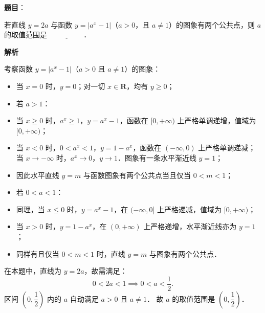 \begin{answer}

\textbf{题目}：

若直线 $y = 2a$ 与函数 $y = |a^x - 1|$（$a > 0$，且 $a \neq 1$）的图象有两个公共点，则 $a$ 的取值范围是 $\underline{\hspace{2cm}}$．

\textbf{解析}

考察函数 $y = |a^x - 1|$（$a > 0$ 且 $a \neq 1$）的图象：
\begin{itemize}
\item 当 $x = 0$ 时，$y = 0$；对一切 $x \in \mathbf{R}$，均有 $y \geqslant 0$；
\item 若 $a > 1$：
\item 当 $x \geqslant 0$ 时，$a^x \geqslant 1$，$y = a^x - 1$，函数在 $[0, +\infty)$ 上严格单调递增，值域为 $[0, +\infty)$；
\item 当 $x < 0$ 时，$0 < a^x < 1$，$y = 1 - a^x$，函数在 $(-\infty, 0)$ 上严格单调递减；当 $x \to -\infty$ 时，$a^x \to 0$，$y \to 1$．图象有一条水平渐近线 $y = 1$；
\item 因此水平直线 $y = m$ 与函数图象有两个公共点当且仅当 $0 < m < 1$；
\item 若 $0 < a < 1$：
\item 同理，当 $x \leqslant 0$ 时，$y = a^x - 1$，在 $(-\infty, 0]$ 上严格递减，值域为 $[0, +\infty)$；
\item 当 $x > 0$ 时，$y = 1 - a^x$，在 $(0, +\infty)$ 上严格递增，水平渐近线亦为 $y = 1$；
\item 同样有且仅当 $0 < m < 1$ 时，直线 $y = m$ 与图象有两个公共点．
\end{itemize}
在本题中，直线为 $y = 2a$，故需满足：
\nopagebreak[4]
\[
0 < 2a < 1 \implies 0 < a < \frac{1}{2}.
\]
区间 $\left(0, \dfrac{1}{2}\right)$ 内的 $a$ 自动满足 $a > 0$ 且 $a \neq 1$．
故 $a$ 的取值范围是 $\left(0, \dfrac{1}{2}\right)$．


\end{answer}
